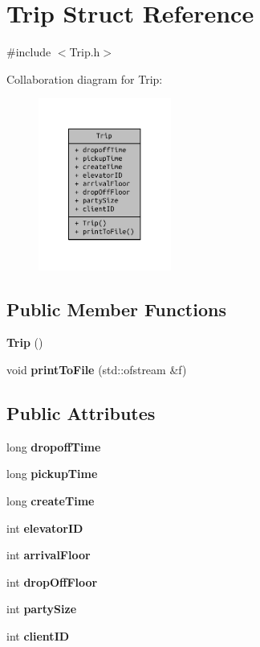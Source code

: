 \section{Trip Struct Reference}
\label{struct_trip}


{\ttfamily \#include $<$Trip.\+h$>$}



Collaboration diagram for Trip\+:
\nopagebreak
\begin{figure}[H]
\begin{center}
\leavevmode
\includegraphics[width=124pt]{struct_trip__coll__graph}
\end{center}
\end{figure}
\subsection*{Public Member Functions}
\begin{DoxyCompactItemize}
\item 
{\bf Trip} ()
\item 
void {\bf print\+To\+File} (std\+::ofstream \&f)
\end{DoxyCompactItemize}
\subsection*{Public Attributes}
\begin{DoxyCompactItemize}
\item 
long {\bf dropoff\+Time}
\item 
long {\bf pickup\+Time}
\item 
long {\bf create\+Time}
\item 
int {\bf elevator\+I\+D}
\item 
int {\bf arrival\+Floor}
\item 
int {\bf drop\+Off\+Floor}
\item 
int {\bf party\+Size}
\item 
int {\bf client\+I\+D}
\end{DoxyCompactItemize}


